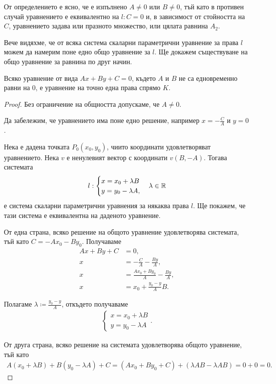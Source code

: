 \documentclass[numbers=endperiod, bibliography=totocnumbered]{scrartcl}
\begin{document}
\begin{note}
  От определението е ясно, че е изпълнено \( A \neq 0 \) или \( B \neq 0 \), тъй като в противен случай уравнението е еквивалентно на \( l: C = 0 \) и, в зависимост от стойността на \( C \), уравнението задава или празното множество, или цялата равнина \( A_2 \).
\end{note}

Вече видяхме, че от всяка система скаларни параметрични уравнение за права \( l \) можем да намерим поне едно общо уравнение за \( l \). Ще докажем съществуване на общо уравнение за равнина по друг начин.

\begin{proposition}
  Всяко уравнение от вида \( Ax + By + C = 0 \), където \( A \) и \( B \) не са едновременно равни на \( 0 \), е уравнение на точно една права спрямо \( K \).
\end{proposition}
\begin{proof}
  Без ограничение на общността допускаме, че \( A \neq 0 \).

  Да забележим, че уравнението има поне едно решение, например \( x = -\frac C A \) и \( y = 0 \).

  Нека е дадена точката \( P_0(x_0, y_0) \), чиито координати удовлетворяват уравнението. Нека \( v \) е ненулевият вектор с координати \( v(B, -A) \). Тогава системата
  \begin{align*}
    l: \begin{cases}
      x = x_0 + \lambda B \\
      y = y_0 - \lambda A,
    \end{cases}
    \lambda \in \mathbb{R}
  \end{align*}
  е система скаларни параметрични уравнения за някаква права \( l \). Ще покажем, че тази система е еквивалентна на даденото уравнение.

  От една страна, всяко решение на общото уравнение удовлетворява системата, тъй като \( C = -Ax_0 - By_0 \). Получаваме
  \begin{align*}
    Ax + By + C &= 0, \\
    x &= -\frac C A -\frac {By} A, \\
    x &= \frac {Ax_0 + By_0} A -\frac {By} A, \\
    x &= x_0 + \frac {y_0 - y} A B.
  \end{align*}

  Полагаме \( \lambda \coloneqq \frac{y_0 - y} A \), откъдето получаваме
  \begin{align*}
    \begin{cases}
      x = x_0 + \lambda B \\
      y = y_0 - \lambda A
    \end{cases}.
  \end{align*}

  От друга страна, всяко решение на системата удовлетворява общото уравнение, тъй като
  \begin{align*}
    A (x_0 + \lambda B) + B (y_0 - \lambda A) + C
    =
    (A x_0 + B y_0 + C) + (\lambda AB - \lambda AB)
    =
    0 + 0 = 0.
  \end{align*}
\end{proof}
\end{document}
